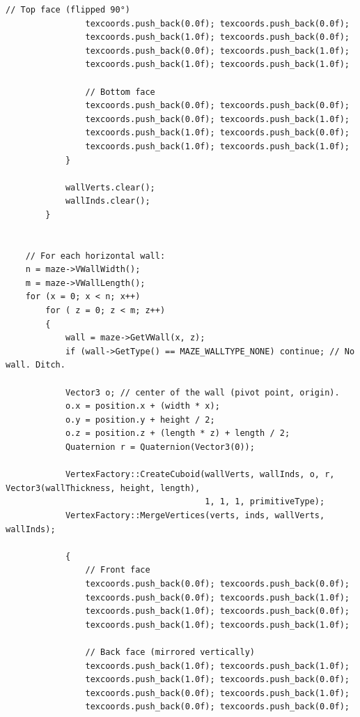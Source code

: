 \begin{lstlisting}[caption= The \texttt{BasicMeshMaker} class]
                // Top face (flipped 90°)
                texcoords.push_back(0.0f); texcoords.push_back(0.0f);
                texcoords.push_back(1.0f); texcoords.push_back(0.0f);
                texcoords.push_back(0.0f); texcoords.push_back(1.0f);
                texcoords.push_back(1.0f); texcoords.push_back(1.0f);
                
                // Bottom face
                texcoords.push_back(0.0f); texcoords.push_back(0.0f);
                texcoords.push_back(0.0f); texcoords.push_back(1.0f);
                texcoords.push_back(1.0f); texcoords.push_back(0.0f);
                texcoords.push_back(1.0f); texcoords.push_back(1.0f);
            }
            
            wallVerts.clear();
            wallInds.clear();
        }
    
    
    // For each horizontal wall:
    n = maze->VWallWidth();
    m = maze->VWallLength();
    for (x = 0; x < n; x++)
        for ( z = 0; z < m; z++)
        {
            wall = maze->GetVWall(x, z);
            if (wall->GetType() == MAZE_WALLTYPE_NONE) continue; // No wall. Ditch.
            
            Vector3 o; // center of the wall (pivot point, origin).
            o.x = position.x + (width * x);
            o.y = position.y + height / 2;
            o.z = position.z + (length * z) + length / 2;
            Quaternion r = Quaternion(Vector3(0));
            
            VertexFactory::CreateCuboid(wallVerts, wallInds, o, r, Vector3(wallThickness, height, length),
                                        1, 1, 1, primitiveType);
            VertexFactory::MergeVertices(verts, inds, wallVerts, wallInds);
            
            {
                // Front face
                texcoords.push_back(0.0f); texcoords.push_back(0.0f);
                texcoords.push_back(0.0f); texcoords.push_back(1.0f);
                texcoords.push_back(1.0f); texcoords.push_back(0.0f);
                texcoords.push_back(1.0f); texcoords.push_back(1.0f);
                
                // Back face (mirrored vertically)
                texcoords.push_back(1.0f); texcoords.push_back(1.0f);
                texcoords.push_back(1.0f); texcoords.push_back(0.0f);
                texcoords.push_back(0.0f); texcoords.push_back(1.0f);
                texcoords.push_back(0.0f); texcoords.push_back(0.0f);
                

\end{lstlisting}
